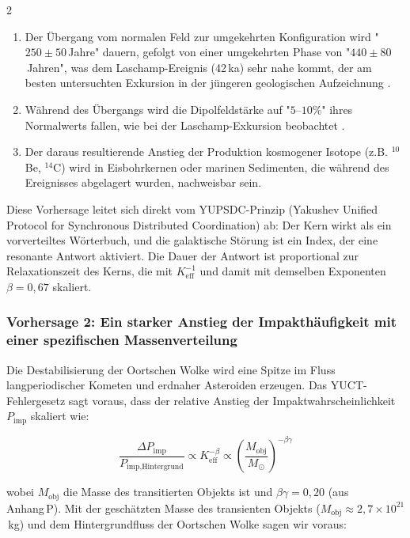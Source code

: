 \documentclass[11pt,a4paper]{article}
\begin{document}
\begin{multicols}{2}
		\begin{enumerate}
			\item Der Übergang vom normalen Feld zur umgekehrten Konfiguration
			wird "\(250 \pm 50\) Jahre" dauern, gefolgt von einer umgekehrten Phase von
			"\(440 \pm 80\) Jahren", was dem Laschamp-Ereignis
			(42 ka) sehr nahe kommt, der am besten untersuchten Exkursion in der jüngeren geologischen
			Aufzeichnung \cite{Laschamp}.
			\item Während des Übergangs wird die Dipolfeldstärke auf
			"\(5\)–\(10\%\)" ihres Normalwerts fallen, wie bei der Laschamp-Exkursion beobachtet \cite{Laschamp}.
			\item Der daraus resultierende Anstieg der Produktion kosmogener Isotope
			(z.B. \(^{10}\)Be, \(^{14}\)C) wird in Eisbohrkernen oder
			marinen Sedimenten, die während des Ereignisses abgelagert wurden, nachweisbar sein.
		\end{enumerate}
		
		Diese Vorhersage leitet sich direkt vom YUPSDC-Prinzip (Yakushev Unified Protocol for Synchronous Distributed Coordination) ab: Der Kern wirkt als ein vorverteiltes Wörterbuch, und die galaktische Störung ist ein Index, der eine resonante Antwort aktiviert. Die Dauer der Antwort ist proportional zur Relaxationszeit des Kerns, die mit \(K_{\mathrm{eff}}^{-1}\) und damit mit demselben Exponenten \(\beta=0,67\) skaliert.
		
		\subsubsection{Vorhersage 2: Ein starker Anstieg der Impakthäufigkeit mit einer spezifischen Massenverteilung}
		
		Die Destabilisierung der Oortschen Wolke wird eine Spitze im Fluss langperiodischer
		Kometen und erdnaher Asteroiden erzeugen. Das YUCT-Fehlergesetz sagt voraus, dass der
		relative Anstieg der Impaktwahrscheinlichkeit \(P_{\text{imp}}\) skaliert wie:
		
		\[
		\frac{\Delta P_{\text{imp}}}{P_{\text{imp,Hintergrund}}} \propto K_{\mathrm{eff}}^{-\beta} \propto \left(\frac{M_{\text{obj}}}{M_{\odot}}\right)^{-\beta\gamma}
		\]
		
		wobei \(M_{\text{obj}}\) die Masse des transitierten Objekts ist und
		\(\beta\gamma = 0,20\) (aus Anhang P). Mit der geschätzten Masse des
		transienten Objekts (\(M_{\text{obj}} \approx 2,7\times10^{21}\) kg) und dem
		Hintergrundfluss der Oortschen Wolke sagen wir voraus:
		

\end{multicols}
\end{document}
